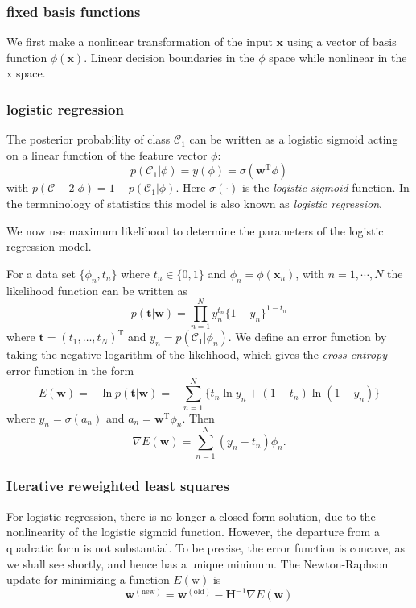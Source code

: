 \documentclass[a4paper]{book}
\newcommand{\mrm}{\mathrm}
\newcommand{\mbf}{\mathbf}
\newcommand{\mcal}{\mathcal}
\newcommand{\ww}{\mbf w}
\newcommand{\ttt}{\mbf t}
\newcommand{\xx}{\mbf x}
\newcommand{\cat}{\mcal C}
\newcommand{\trans}{^{\mrm T}}
\begin{document}
\subsubsection{fixed basis functions}
We first make a nonlinear transformation of the input $\xx$ using a vector of basis function $\phi(\xx)$. Linear decision boundaries in the $\phi$ space while nonlinear in the $\mathrm x$ space.
\subsubsection{logistic regression}
The posterior probability of class $\cat_1$ can be written as a logistic sigmoid acting on a linear function of the feature vector $\phi$:
\begin{equation}\label{}
  p(\cat_1|\phi)=y(\phi)=\sigma(\ww\trans\phi)
\end{equation} 
with $p(\cat-2|\phi) = 1-p(\cat_1|\phi)$. Here $\sigma(\cdot)$ is the \textit{logistic sigmoid} function. In the termninology of statistics this model is also known as \textit{logistic regression}. 

We now use maximum likelihood to determine the parameters of the logistic regression model. 

For a data set $\{\phi_n,t_n\}$ where $t_n\in\{0,1\}$ and $\phi_n=\phi(\xx_n)$, with $n=1,\cdots,N$ the likelihood function can be written as 
\begin{equation}\label{}
  p(\ttt|\ww) = \prod_{n=1}^{N}y_n^{t_n}\{1-y_n\}^{1-t_n}
\end{equation} 
where $\ttt = (t_1,\dots,t_N)\trans$ and $y_n = p(\cat_1|\phi_n)$. We define an error function by taking the negative logarithm of the likelihood, which gives the \textit{cross-entropy} error function in the form
\begin{equation}\label{}
  E(\ww) = -\ln p(\ttt|\ww) = -\sum_{n=1}^{N}\{t_n\ln y_n+(1-t_n)\ln(1-y_n)\}
\end{equation}
where $y_n=\sigma(a_n)$ and $a_n=\ww\trans\phi_n$. Then
\begin{equation}\label{}
  \nabla E(\ww) = \sum_{n=1}^{N}(y_n-t_n)\phi_n.
\end{equation}


\subsubsection{Iterative reweighted least squares }
For logistic regression, there is no longer a closed-form solution, due to the nonlinearity of the logistic sigmoid function. However, the departure from a quadratic form is not substantial. To be precise, the error function is concave, as we shall see shortly, and hence has a unique minimum.\newline
The Newton-Raphson update for minimizing a function $E(\mathrm w)$ is
\begin{equation}
   \ww^{(\mathrm {new})}=\ww^{(\mathrm {old})}-\mbf H^{-1}\nabla E(\ww)
\end{equation}
\end{document}
